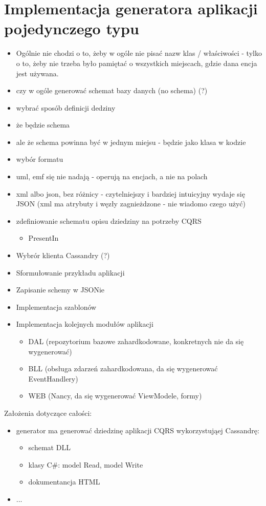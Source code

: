 \chapter{Implementacja generatora aplikacji pojedynczego typu} \label{chap:implementation:single_type}

\begin{itemize}
 \item Ogólnie nie chodzi o to, żeby w ogóle nie pisać nazw klas / właściwości - tylko o to, żeby nie trzeba było pamiętać o wszystkich miejscach, gdzie dana encja jest używana.
 \item czy w ogóle generować schemat bazy danych (no schema) (?)
 \item wybrać sposób definicji dedziny
  \item że będzie schema
  \item ale że schema powinna być w jednym miejsu - będzie jako klasa w kodzie
  \item wybór formatu
   \item uml, emf się nie nadają - operują na encjach, a nie na polach
   \item xml albo json, bez różnicy - czytelniejszy i bardziej intuicyjny wydaje się JSON (xml ma atrybuty i węzły zagnieżdzone - nie wiadomo czego użyć)
  \item zdefiniowanie schematu opisu dziedziny na potrzeby CQRS
   \begin{itemize}
    \item PresentIn
   \end{itemize}
 \item Wybrór klienta Cassandry (?)
 \item Sformułowanie przykładu aplikacji
 \item Zapisanie schemy w JSONie
 \item Implementacja szablonów
 \item Implementacja kolejnych modułów aplikacji
  \begin{itemize}
   \item DAL (repozytorium bazowe zahardkodowane, konkretnych nie da się wygenerować)
   \item BLL (obsługa zdarzeń zahardkodowana, da się wygenerować EventHandlery)
   \item WEB (Nancy, da się wygenerować ViewModele, formy)
  \end{itemize}
\end{itemize}



Założenia dotyczące całości:

\begin{itemize}
 \item generator ma generować dziedzinę aplikacji CQRS wykorzystująej Cassandrę:
  \begin{itemize}
   \item schemat DLL
   \item klasy C\#: model Read, model Write
   \item dokumentancja HTML
  \end{itemize}
 \item ...
\end{itemize}
